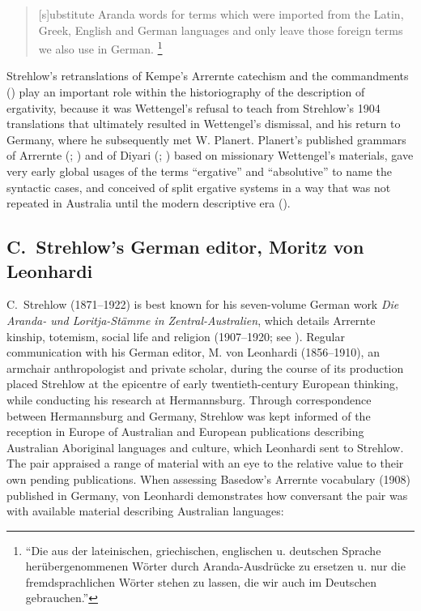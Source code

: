 \begin{quote}
 [s]ubstitute Aranda words for terms which were imported from the Latin, Greek, English and German languages and only leave those foreign terms we also use in German. \citep{strehlow_galtjindinjamea-pape_1904}\footnote{“Die aus der lateinischen, griechischen, englischen u. deutschen Sprache herübergenommenen Wörter durch Aranda-Ausdrücke zu ersetzen u. nur die fremdsprachlichen Wörter stehen zu lassen, die wir auch im Deutschen gebrauchen.''}
\end{quote}

Strehlow’s retranslations of Kempe’s Arrernte catechism and the commandments (\citeyear{strehlow_1904b}) play an important role within the historiography of the description of ergativity, because it was Wettengel’s refusal to teach from Strehlow’s 1904 translations that ultimately resulted in Wettengel’s dismissal, and his return to Germany, where he subsequently met W. Planert. Planert’s published grammars of Arrernte (\citeyear{planert_australische_1907}; ) and of Diyari (\citeyear{planert_australische_1908}; ) based on missionary Wettengel’s materials, gave very early global usages of the terms “ergative” and “absolutive” to name the syntactic cases, and conceived of split ergative systems in a way that was not repeated in Australia until the modern descriptive era ().

\subsection{C.~Strehlow’s German editor, Moritz von Leonhardi}
\label{sec:key:9.2.2}\label{bkm:Ref456272403}\label{bkm:Ref74834598}

C.~Strehlow (1871--1922) is best known for his seven-volume German work \textit{Die Aranda- und Loritja-Stämme in Zentral-Australien}, which details Arrernte kinship, totemism, social life and religion (1907--1920; see \citealt{kenny_arandas_2013}). Regular communication with his German editor, M. von Leonhardi (1856--1910), an armchair anthropologist and private scholar, during the course of its production placed Strehlow at the epicentre of early twentieth-century European thinking, while conducting his research at Hermannsburg. Through correspondence between Hermannsburg and Germany, Strehlow was kept informed of the reception in Europe of Australian and European publications describing Australian Aboriginal languages and culture, which Leonhardi sent to Strehlow. The pair appraised a range of material with an eye to the relative value to their own pending publications. When assessing Basedow’s Arrernte vocabulary (1908) published in Germany, von Leonhardi demonstrates how conversant the pair was with available material describing Australian languages:

